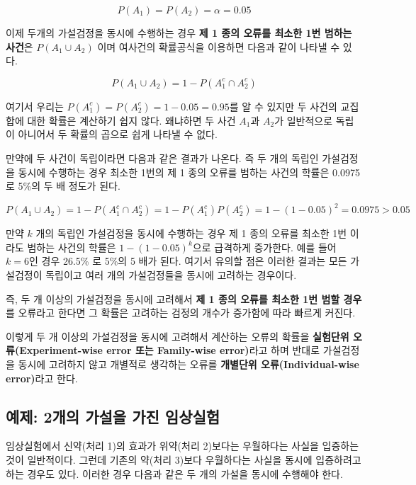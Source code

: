 \documentclass[
  10pt,
]{book}
\theoremstyle{definition}
\theoremstyle{definition}
\theoremstyle{definition}
\theoremstyle{definition}
\theoremstyle{remark}
\begin{document}
\[ P( A_1 ) =  P(A_2) = \alpha =0.05 \]

이제 두개의 가설검정을 동시에 수행하는 경우 \textbf{제 1 종의 오류를 최소한
1번 범하는 사건}은 \(P(A_1 \cup A_2)\) 이며 여사건의 확률공식을 이용하면
다음과 같이 나타낼 수 있다.

\[ P( A_1 \cup A_2 ) = 1- P(A_1^c \cap A^c_2 ) \]

여기서 우리는 \(P(A_1^c)=P(A_2^c)=1-0.05=0.95\)를 알 수 있지만 두 사건의
교집합에 대한 확률은 계산하기 쉽지 않다. 왜냐하면 두 사건 \(A_1\)과
\(A_2\)가 일반적으로 독립이 아니어서 두 확률의 곱으로 쉽게 나타낼 수 없다.

만약에 두 사건이 독립이라면 다음과 같은 결과가 나온다. 즉 두 개의 독립인
가설검정을 동시에 수행하는 경우 최소한 1번의 제 1 종의 오류를 범하는
사건의 학률은 0.0975로 5\%의 두 배 정도가 된다.

\[ P( A_1 \cup A_2 ) = 1- P(A_1^c \cap A^c_2 ) =1-P(A_1^c)P(A^c_2 ) = 1-(1-0.05)^2 = 0.0975 > 0.05 \]

만약 \(k\) 개의 독립인 가설검정을 동시에 수행하는 경우 제 1 종의 오류를
최소한 1번 이라도 범하는 사건의 학률은 \(1-(1-0.05)^k\)으로 급격하게
증가한다. 예를 들어 \(k=6\)인 경우 26.5\% 로 5\%의 5 배가 된다. 여기서
유의할 점은 이러한 결과는 모든 가설검정이 독립이고 여러 개의
가설검정들을 동시에 고려하는 경우이다.

즉, 두 개 이상의 가설검정을 동시에 고려해서 \textbf{제 1 종의 오류를 최소한
1번 범할 경우}를 오류라고 한다면 그 확률은 고려하는 검정의 개수가
증가함에 따라 빠르게 커진다.

이렇게 두 개 이상의 가설검정을 동시에 고려해서 계산하는 오류의 확률을
\textbf{실험단위 오류(Experiment-wise error 또는 Family-wise error)}라고 하며 반대로 가설검정을
동시에 고려하지 않고 개별적로 생각하는 오류를 \textbf{개별단위 오류(Individual-wise error)}라고 한다.

\hypertarget{uxc608uxc81c-2uxac1cuxc758-uxac00uxc124uxc744-uxac00uxc9c4-uxc784uxc0c1uxc2e4uxd5d8}{%
\subsection{예제: 2개의 가설을 가진 임상실험}\label{uxc608uxc81c-2uxac1cuxc758-uxac00uxc124uxc744-uxac00uxc9c4-uxc784uxc0c1uxc2e4uxd5d8}}

임상실험에서 신약(처리 1)의 효과가 위약(처리 2)보다는 우월하다는 사실을
입증하는 것이 일반적이다. 그런데 기존의 약(처리 3)보다 우월하다는 사실을
동시에 입증하려고 하는 경우도 있다. 이러한 경우 다음과 같은 두 개의
가설을 동시에 수행해야 한다.
\end{document}
